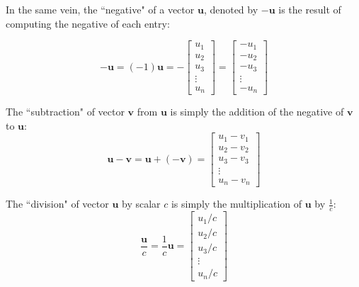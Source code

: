 \documentclass{article}
\begin{document}
In the same vein, the ``negative" of a vector \(\mathbf{u}\), denoted by \(-\mathbf{u}\) is the result of computing the negative of each entry:

\[-\mathbf{u} = (-1)\mathbf{u} = -\begin{bmatrix} u_1 \\ u_2 \\ u_3 \\ \vdots \\ u_n \end{bmatrix} = \begin{bmatrix} -u_1  \\ -u_2 \\ -u_3 \\ \vdots \\ -u_n \end{bmatrix}\]

The ``subtraction" of vector \(\mathbf{v}\) from \(\mathbf{u}\) is simply the addition of the negative of \(\mathbf{v}\) to \(\mathbf{u}\):
\[\mathbf{u} - \mathbf{v} = \mathbf{u} + (-\mathbf{v}) = \begin{bmatrix} u_1 - v_1 \\ u_2 - v_2 \\ u_3 - v_3 \\ \vdots \\ u_n - v_n \end{bmatrix}\]

The ``division" of vector \(\mathbf{u}\) by scalar \(c\) is simply the multiplication of \(\mathbf{u}\) by \(\frac{1}{c}\):
\[\frac{\mathbf{u}}{c} = \frac{1}{c}\mathbf{u} = \begin{bmatrix} u_1/c  \\ u_2/c \\ u_3/c \\ \vdots \\ u_n/c \end{bmatrix}\]
\end{document}
